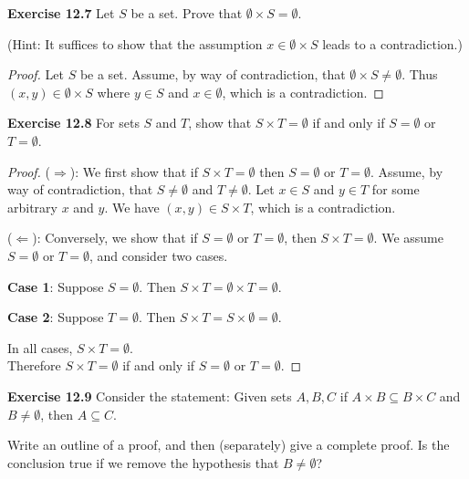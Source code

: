 \documentclass[12pt,oneside]{article}
\newenvironment{exercise}[1]{\vspace{.1in}\noindent\textbf{Exercise #1 \hspace{.05em}}}{}
\begin{document}

\begin{exercise}{12.7}
Let $S$ be a set. Prove that $\emptyset \times S = \emptyset$.

(Hint: It suffices to show that the assumption $x \in \emptyset \times S$ leads to a contradiction.)
\end{exercise}

\begin{proof}
Let $S$ be a set. Assume, by way of contradiction, that $\emptyset \times S \not= \emptyset$. Thus $(x,y) \in \emptyset \times S$ where $y \in S$ and $x \in \emptyset$, which is a contradiction.
\end{proof}



\begin{exercise}{12.8}
For sets $S$ and $T$, show that $S \times T = \emptyset$ if and only if $S = \emptyset$ or $T = \emptyset$.
\end{exercise}

\begin{proof}
($\Rightarrow$): We first show that if $S \times T = \emptyset$ then $S = \emptyset$ or $T = \emptyset$. Assume, by way of contradiction, that $S \not= \emptyset$ and $T \not= \emptyset$. Let $x \in S$ and $y \in T$ for some arbitrary $x$ and $y$. We have $(x, y) \in S \times T$, which is a contradiction.

($\Leftarrow$): Conversely, we show that if $S = \emptyset$ or $T = \emptyset$, then $S \times T = \emptyset$. We assume $S = \emptyset$ or $T = \emptyset$, and consider two cases.

\textbf{Case 1}: Suppose $S = \emptyset$. Then $S \times T = \emptyset \times T = \emptyset$.

\textbf{Case 2}: Suppose $T = \emptyset$. Then $S \times T = S \times \emptyset = \emptyset$.

In all cases, $S \times T = \emptyset$. \\
Therefore $S \times T = \emptyset$ if and only if $S = \emptyset$ or $T = \emptyset$.
\end{proof}



\begin{exercise}{12.9}
Consider the statement: Given sets $A,B,C$ if $A \times B \subseteq B \times C$ and $B \not= \emptyset$, then $A \subseteq C$.

Write an outline of a proof, and then (separately) give a complete proof. Is the conclusion true if we remove the hypothesis that $B \not= \emptyset$?
\end{exercise}
\end{document}
